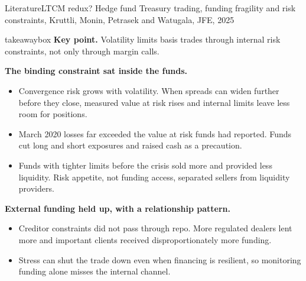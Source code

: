 \documentclass[aspectratio=169,11pt]{beamer}
\newcommand{\keypoint}[1]{%
  \begin{beamercolorbox}[sep=0.6em,wd=\textwidth]{takeawaybox}
    \textbf{Key point.} #1
  \end{beamercolorbox}}
\begin{document}
\begin{frame}{Literature}{LTCM redux? Hedge fund Treasury trading, funding fragility and risk constraints, Kruttli, Monin, Petrasek and Watugala, JFE, 2025}
  \footnotesize
  \keypoint{Volatility limits basis trades through internal risk constraints, not only through margin calls.}
  \medskip
  \textbf{The binding constraint sat inside the funds.}
  \begin{itemize}
    \item Convergence risk grows with volatility. When spreads can widen further before they close, measured value at risk rises and internal limits leave less room for positions.
    \item March 2020 losses far exceeded the value at risk funds had reported. Funds cut long and short exposures and raised cash as a precaution.
    \item Funds with tighter limits before the crisis sold more and provided less liquidity. Risk appetite, not funding access, separated sellers from liquidity providers.
  \end{itemize}
  \smallskip
  \textbf{External funding held up, with a relationship pattern.}
  \begin{itemize}
    \item Creditor constraints did not pass through repo. More regulated dealers lent more and important clients received disproportionately more funding.
    \item Stress can shut the trade down even when financing is resilient, so monitoring funding alone misses the internal channel.
  \end{itemize}
\end{frame}
\end{document}
